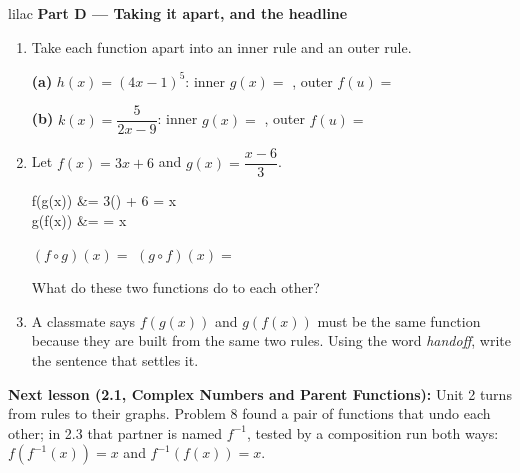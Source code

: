 \documentclass[10pt]{article}
\begin{document}
\vspace{0.1in}

\begin{headlinebox}{lilac}
\textbf{\color{plum}Part D --- Taking it apart, and the headline}
\end{headlinebox}

\begin{enumerate}[leftmargin=1.9em, itemsep=8pt, start=7]

\item Take each function apart into an inner rule and an outer rule.

      \textbf{(a)} $h(x) = (4x - 1)^5$: \quad inner $g(x) = $ \blank{2.4cm}, \quad
      outer $f(u) = $ \blank{2.2cm}

      \textbf{(b)} $k(x) = \dfrac{5}{2x - 9}$: \quad inner $g(x) = $ \blank{2.4cm}, \quad
      outer $f(u) = $ \blank{2.2cm}

\item Let $f(x) = 3x + 6$ and $g(x) = \dfrac{x - 6}{3}$.

\begin{work}
  f(g(x)) &= 3\!\left(\right) + 6 = x \\
  g(f(x)) &=  = x
\end{work}

      $(f \circ g)(x) = $ \blank{2.0cm} \qquad $(g \circ f)(x) = $ \blank{2.0cm}

      What do these two functions do to each other?
      \writespace{0.9cm}{}

\item A classmate says $f(g(x))$ and $g(f(x))$ must be the same function because they are built
      from the same two rules. Using the word \emph{handoff}, write the sentence that settles it.
      \writespace{1.2cm}{}

\end{enumerate}

\vspace{0.08in}

\boxguard[8]
\begin{spiralbox}
\small
\textbf{Next lesson (2.1, Complex Numbers and Parent Functions):} Unit 2 turns from rules to
their graphs. Problem 8 found a pair of functions that undo each other; in 2.3 that partner is
named $f^{-1}$, tested by a composition run both ways: $f(f^{-1}(x)) = x$ and $f^{-1}(f(x)) = x$.
\end{spiralbox}
\end{document}

